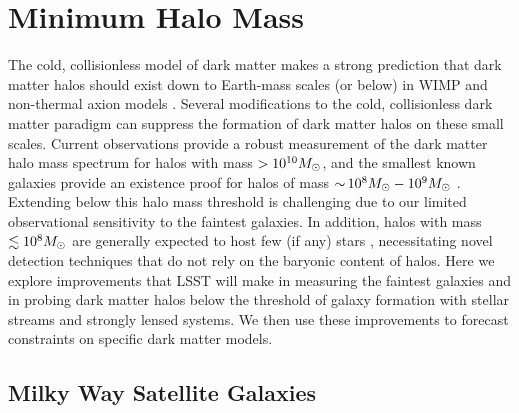 \section{Minimum Halo Mass}
\label{sec:halo_mass}


The cold, collisionless model of dark matter makes a strong prediction that dark matter halos should exist down to Earth-mass scales (or below) in WIMP and non-thermal axion models \citep{Green:2003un,2005Natur.433..389D,1412.5930}.
Several modifications to the cold, collisionless dark matter paradigm can suppress the formation of dark matter halos on these small scales.
Current observations provide a robust measurement of the dark matter halo mass spectrum for halos with mass $> 10^{10}M_\odot$, and the smallest known galaxies provide an existence proof for halos of mass $ {\sim}\, 10^8 M_\odot - 10^9 M_\odot$ \citep{2017MNRAS.467.2019R,behroozi2018,Jethwa:2018,Kim:2017iwr,Nadler:2018,1807.07093}. 
Extending below this halo mass threshold is challenging due to our limited observational sensitivity to the faintest galaxies.
In addition, halos with mass $\lesssim 10^8 M_\odot$ are generally expected to host few (if any) stars \citep{1102.4638,1505.06209}, necessitating novel detection techniques that do not rely on the baryonic content of halos.
Here we explore improvements that LSST will make in measuring the faintest galaxies and in probing dark matter halos below the threshold of galaxy formation with stellar streams and strongly lensed systems. We then use these improvements to forecast constraints on specific dark matter models.

\subsection{Milky Way Satellite Galaxies } 
\label{sec:smallest_galaxies}

